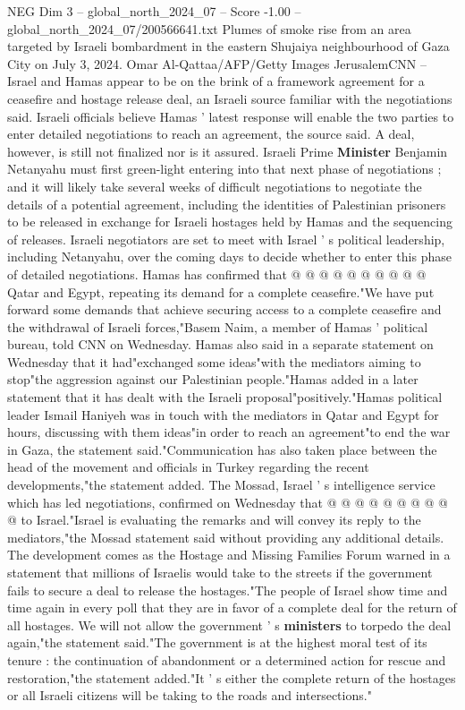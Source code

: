 \begin{textsample}{NEG Dim 3 – global\_north\_2024\_07 – Score -1.00 – global\_north\_2024\_07/200566641.txt}  \label{ex:f3_neg_368}
Plumes of smoke rise from an area targeted by Israeli bombardment in the eastern Shujaiya neighbourhood of Gaza City on July 3, 2024.
Omar Al-Qattaa/AFP/Getty Images JerusalemCNN -- Israel and Hamas appear to be on the brink of a framework agreement for a ceasefire and hostage release deal, an Israeli source familiar with the negotiations said.
Israeli officials believe Hamas ' latest response will enable the two parties to enter detailed negotiations to reach an agreement, the source said.
A deal, however, is still not finalized nor is it assured.
Israeli Prime \textbf{Minister} Benjamin Netanyahu must first green-light entering into that next phase of negotiations ; and it will likely take several weeks of difficult negotiations to negotiate the details of a potential agreement, including the identities of Palestinian prisoners to be released in exchange for Israeli hostages held by Hamas and the sequencing of releases.
Israeli negotiators are set to meet with Israel ' s political leadership, including Netanyahu, over the coming days to decide whether to enter this phase of detailed negotiations.
Hamas has confirmed that @ @ @ @ @ @ @ @ @ @ Qatar and Egypt, repeating its demand for a complete ceasefire."We have put forward some demands that achieve securing access to a complete ceasefire and the withdrawal of Israeli forces,"Basem Naim, a member of Hamas ' political bureau, told CNN on Wednesday.
Hamas also said in a separate statement on Wednesday that it had"exchanged some ideas"with the mediators aiming to stop"the aggression against our Palestinian people."Hamas added in a later statement that it has dealt with the Israeli proposal"positively."Hamas political leader Ismail Haniyeh was in touch with the mediators in Qatar and Egypt for hours, discussing with them ideas"in order to reach an agreement"to end the war in Gaza, the statement said."Communication has also taken place between the head of the movement and officials in Turkey regarding the recent developments,"the statement added.
The Mossad, Israel ' s intelligence service which has led negotiations, confirmed on Wednesday that @ @ @ @ @ @ @ @ @ @ to Israel."Israel is evaluating the remarks and will convey its reply to the mediators,"the Mossad statement said without providing any additional details.
The development comes as the Hostage and Missing Families Forum warned in a statement that millions of Israelis would take to the streets if the government fails to secure a deal to release the hostages."The people of Israel show time and time again in every poll that they are in favor of a complete deal for the return of all hostages.
We will not allow the government ' s \textbf{ministers} to torpedo the deal again,"the statement said."The government is at the highest moral test of its tenure : the continuation of abandonment or a determined action for rescue and restoration,"the statement added."It ' s either the complete return of the hostages or all Israeli citizens will be taking to the roads and intersections."

\end{textsample}
